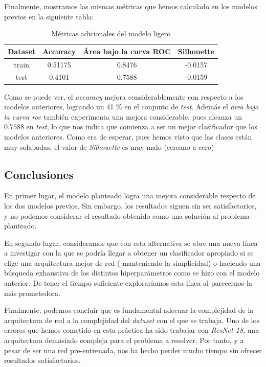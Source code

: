 \documentclass[11pt]{article}
\begin{document}
Finalmente, mostramos las mismas métricas que hemos calculado en los modelos previos en la siguiente tabla:

\begin{table}[H]
  \begin{center}
      \begin{tabular}{|c|c|c|c|}
          \hline
          Dataset & Accuracy & Área bajo la curva ROC & Silhouette \\
          \hline
          train & 0.51175 &  0.8476 & -0.0157\\
          test & 0.4101 & 0.7588 &  -0.0159 \\
          \hline
      \end{tabular}
  \end{center}
     \caption{Métricas adicionales del modelo ligero}
  \end{table}

Como se puede ver, el \emph{accuracy} mejora considerablemente con respecto a los modelos anteriores, logrando un 41 \% en el conjunto de \emph{test}. Además el \emph{área bajo la curva roc} también experimenta una mejora considerable, pues alcanza un $0.7588$ en \emph{test}, lo que nos indica que comienza a ser un mejor clasificador que los modelos anteriores. Como era de esperar, pues hemos visto que las clases están muy solapadas, el valor de \emph{Silhouette} es muy malo (cercano a cero)

\subsection{Conclusiones}

En primer lugar, el modelo planteado logra una mejora considerable respecto de los dos modelos previos. Sin embargo, los resultados siguen sin ser satisfactorios, y no podemos considerar el resultado obtenido como una solución al problema planteado.

En segundo lugar, consideramos que con esta alternativa se abre una nueva línea a investigar con la que se podría llegar a obtener un clasificador apropiado si se elige una arquitectura mejor de red ( manteniendo la simplicidad) o haciendo una búsqueda exhaustiva de los distintos hiperparámetros como se hizo con el modelo anterior. De tener el tiempo suficiente exploraríamos esta línea al parecernos la más prometedora.

Finalmente, podemos concluir que es fundamental adecuar la complejidad de la arquitectura de red a la complejidad del \emph{dataset} con el que se trabaja. Uno de los errores que hemos cometido en esta práctica ha sido trabajar con \emph{ResNet-18}, una arquitectura demasiado compleja para el problema a resolver. Por tanto, y a pesar de ser una red pre-entrenada, nos ha hecho perder mucho tiempo sin ofrecer resultados satisfactorios.
\end{document}
